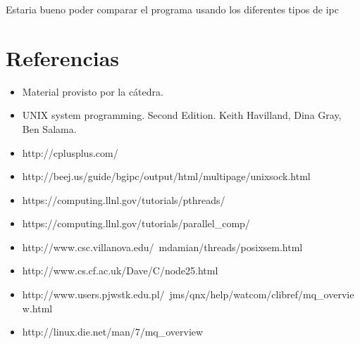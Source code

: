 \documentclass[a4paper,10pt]{article}
\begin{document}
Estaria bueno poder comparar el programa usando los diferentes tipos de ipc

\newpage     
\section{Referencias}

\begin{itemize}
  \item Material provisto por la cátedra.
  \item UNIX system programming. Second Edition. Keith Havilland, Dina Gray, Ben Salama.
  \item http://cplusplus.com/
  \item http://beej.us/guide/bgipc/output/html/multipage/unixsock.html
  \item https://computing.llnl.gov/tutorials/pthreads/
  \item https://computing.llnl.gov/tutorials/parallel\_comp/
  \item http://www.csc.villanova.edu/~mdamian/threads/posixsem.html
  \item http://www.cs.cf.ac.uk/Dave/C/node25.html
  \item http://www.users.pjwstk.edu.pl/~jms/qnx/help/watcom/clibref/mq\_overview.html
  \item http://linux.die.net/man/7/mq\_overview
\end{itemize}
   
\end{document}
